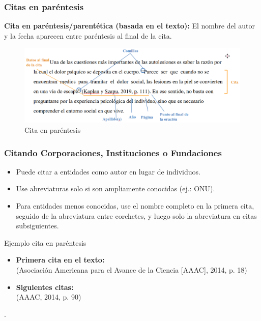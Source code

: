 \documentclass[
11pt, %
]{beamer}
\begin{document}
\begin{frame}
	\frametitle{Citas en paréntesis}

	\textbf{Cita en paréntesis/parentética (basada en el texto):} El nombre del autor y la fecha aparecen entre paréntesis al final de la cita.

	\begin{exampleblock}{}
		\begin{figure}
			\centering
			\includegraphics[width=1\linewidth]{images/screenshot002}
			\caption{Cita en paréntesis}
			\label{fig:screenshot002}
		\end{figure}

	\end{exampleblock}

\end{frame}


\begin{frame}
	\frametitle{Citando Corporaciones, Instituciones o Fundaciones}
	\begin{itemize}
		\item Puede citar a entidades como autor en lugar de individuos.
		\item Use abreviaturas solo si son ampliamente conocidas (ej.: ONU).
		\item Para entidades menos conocidas, use el nombre completo en la primera cita, seguido de la abreviatura entre corchetes, y luego solo la abreviatura en citas subsiguientes.
	\end{itemize}

	\begin{exampleblock}{Ejemplo cita en paréntesis}
		\begin{itemize}
			\item \textbf{Primera cita en el texto:} \\(Asociación Americana para el Avance de la Ciencia {\color{blue}[}AAAC{\color{blue}]}, 2014, p. 18)
			\item \textbf{Siguientes citas:} \\ (AAAC, 2014, p. 90)
		\end{itemize}.
	\end{exampleblock}
\end{frame}
\end{document}
